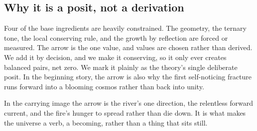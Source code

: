 \subsection{Why it is a posit, not a derivation}

Four of the base ingredients are heavily constrained. The geometry, the ternary tone, the local conserving rule,
and the growth by reflection are forced or measured. The arrow is the one value, and values are chosen rather
than derived. We add it by decision, and we make it conserving, so it only ever creates balanced pairs, net
zero. We mark it plainly as the theory's single deliberate posit. In the beginning story, the arrow is also why
the first self-noticing fracture runs forward into a blooming cosmos rather than back into unity.

In the carrying image the arrow is the river's one direction, the relentless forward current, and the fire's
hunger to spread rather than die down. It is what makes the universe a verb, a becoming, rather than a thing that
sits still.
